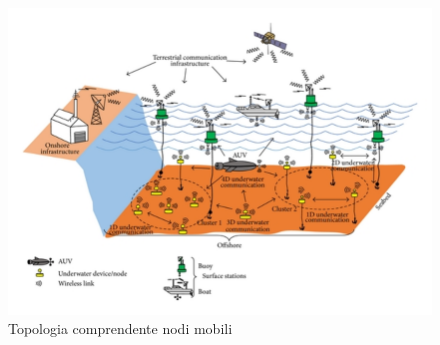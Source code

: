 \begin{figure}[h]
	\includegraphics[width=\linewidth]{auv_arch.png}
	\caption{ Topologia comprendente nodi mobili}
	\label{fig:}
\end{figure}


